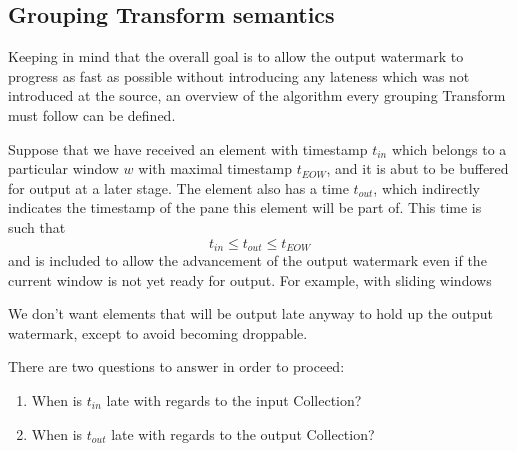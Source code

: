 \subsection{Grouping Transform semantics}


Keeping in mind that the overall goal is to allow the output watermark to progress as fast as possible without introducing any lateness which was not introduced at the source, an overview of the algorithm every grouping Transform must follow can be defined.

Suppose that we have received an element with timestamp $t_{\mathit{in}}$ which belongs to a particular window $w$ with maximal timestamp $t_{\mathit{EOW}}$, and it is abut to be buffered for output at a later stage.
The element also has a time $t_{\mathit{out}}$, which indirectly indicates the timestamp of the pane this element will be part of.
This time is such that \[t_{\mathit{in}} \leq t_{\mathit{out}} \leq t_{\mathit{EOW}}\] and is included to allow the advancement of the output watermark even if the current window is not yet ready for output.
For example, with sliding windows


We don't want elements that will be output late anyway to hold up the output watermark, except to avoid becoming droppable.

There are two questions to answer in order to proceed:
\begin{enumerate}
	\item When is $t_{\mathit{in}}$ late with regards to the input Collection?
	\item When is $t_{\mathit{out}}$ late with regards to the output Collection?
\end{enumerate}

